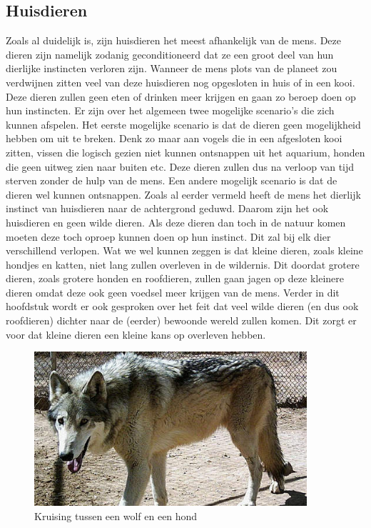 \subsection{Huisdieren}
Zoals al duidelijk is, zijn huisdieren het meest afhankelijk van de mens. Deze dieren zijn namelijk zodanig geconditioneerd dat ze een groot deel van hun dierlijke instincten verloren zijn. Wanneer de mens plots van de planeet zou verdwijnen zitten veel van deze huisdieren nog opgesloten in huis of in een kooi. Deze dieren zullen geen eten of drinken meer krijgen en gaan zo beroep doen op hun instincten. Er zijn over het algemeen twee mogelijke scenario's die zich kunnen afspelen.
\newline
Het eerste mogelijke scenario is dat de dieren geen mogelijkheid hebben om uit te breken. Denk zo maar aan vogels die in een afgesloten kooi zitten, vissen die logisch gezien niet kunnen ontsnappen uit het aquarium, honden die geen uitweg zien naar buiten etc. Deze dieren zullen dus na verloop van tijd sterven zonder de hulp van de mens. 
\newline
Een andere mogelijk scenario is dat de dieren wel kunnen ontsnappen. Zoals al eerder vermeld heeft de mens het dierlijk instinct van huisdieren naar de achtergrond geduwd. Daarom zijn het ook huisdieren en geen wilde dieren. Als deze dieren dan toch in de natuur komen moeten deze toch oproep kunnen doen op hun instinct. Dit zal bij elk dier verschillend verlopen. Wat we wel kunnen zeggen is dat kleine dieren, zoals kleine hondjes en katten, niet lang zullen overleven in de wildernis. Dit doordat grotere dieren, zoals grotere honden en roofdieren, zullen gaan jagen op deze kleinere dieren omdat deze ook geen voedsel meer krijgen van de mens. Verder in dit hoofdstuk wordt er ook gesproken over het feit dat veel wilde dieren (en dus ook roofdieren) dichter naar de (eerder) bewoonde wereld zullen komen. Dit zorgt er voor dat kleine dieren een kleine kans op overleven hebben. 
\newline
\begin{figure}
  \centering
    \includegraphics[width=0.9\textwidth]{WolfHond.jpg}
  \caption{Kruising tussen een wolf en een hond \cite{redactieHLN}}
  \label{fig:wolfhond}
\end{figure}
